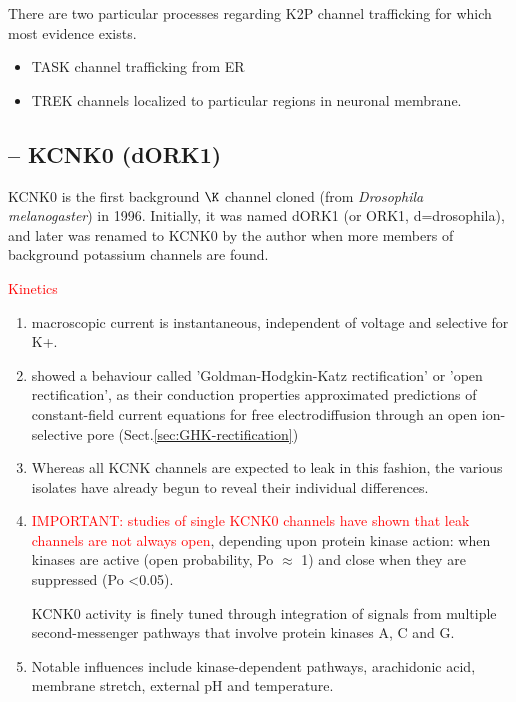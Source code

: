 There are two particular processes regarding K2P channel trafficking
for which most evidence exists.
\begin{itemize}
  \item TASK channel trafficking from ER
  \item TREK channels localized to particular regions in neuronal membrane.
\end{itemize}

\subsection{-- KCNK0 (dORK1)}
\label{sec:KCNK0}

KCNK0 is the first background $\K$ channel cloned (from {\it Drosophila
melanogaster}) in 1996. Initially, it was named dORK1 (or ORK1, d=drosophila),
and later was renamed to KCNK0 by the author when more members of background
potassium channels are found.

\textcolor{red}{Kinetics}
\begin{enumerate}

  \item macroscopic current is instantaneous, independent of voltage and
  selective for K+.

  \item  showed a behaviour called 'Goldman-Hodgkin-Katz rectification' or 'open
  rectification', as their conduction properties approximated predictions of
  constant-field current equations for free electrodiffusion through an open
  ion-selective pore (Sect.\ref{sec:GHK-rectification})

  \item Whereas all KCNK channels are expected to leak in this fashion, the
  various isolates have already begun to reveal their individual differences.

  \item  \textcolor{red}{IMPORTANT: studies of single KCNK0 channels have shown
  that leak channels are not always open}, depending upon protein kinase action:
  when kinases are active (open probability, Po $\approx$ 1) and close when they
  are suppressed (Po <0.05).

KCNK0 activity is finely tuned through integration of signals from multiple
second-messenger pathways that involve protein kinases A, C and G.

  \item Notable influences include kinase-dependent pathways, arachidonic acid,
  membrane stretch, external pH and temperature.

\end{enumerate}


